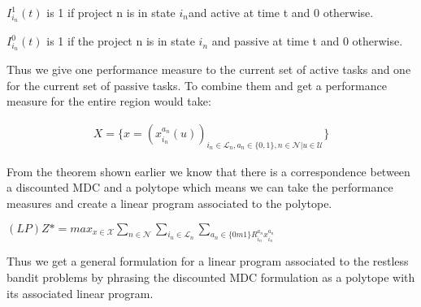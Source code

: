 $I_{i_n}^1(t)$ is 1 if project n is in state $i_n$and active at time t and 0 otherwise.

$I_{i_n}^0(t)$ is 1 if the project n is in state $i_n$ and passive at time t and 0 otherwise.

Thus we give one performance measure to the current set of active tasks and one for the current set of passive tasks. To combine them and get a performance measure for the entire region would take: 

\begin{align*}
X = \{x = (x_{i_n}^{a_n}(u))_{i_n \in \mathcal{L}_n, a_n \in \{0,1\}, n \in \mathcal{N}|u \in \mathcal{U}}\}
\end{align*}

From the theorem shown earlier we know that there is a correspondence between a discounted MDC and a polytope which means we can take the performance measures and create a linear program associated to the polytope.

$(LP) Z* = max_{x \in \mathcal{X}} \sum_{n \in \mathcal{N}} \sum_{i_n \in \mathcal{L}_n} 
\sum_{a_n \in \{ 0m1\} R_{i_n}^{a_n} x_{i_n}^{a_n}} $

Thus we get a general formulation for a linear program associated to the restless bandit problems by phrasing the discounted MDC formulation as a polytope with its associated linear program. 

